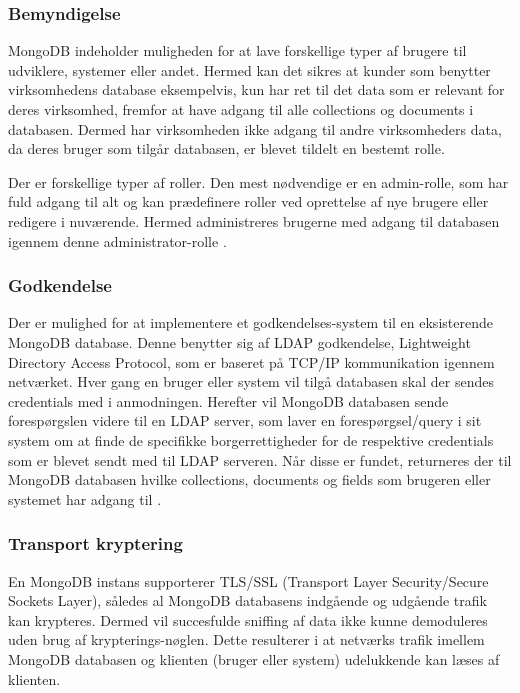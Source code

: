 \begin{appendices}
\subsubsection{Bemyndigelse}
MongoDB indeholder muligheden for at lave forskellige typer af brugere til udviklere, systemer eller andet. Hermed kan det sikres at kunder som benytter virksomhedens database eksempelvis, kun har ret til det data som er relevant for deres virksomhed, fremfor at have adgang til alle collections og documents i databasen. Dermed har virksomheden ikke adgang til andre virksomheders data, da deres bruger som tilgår databasen, er blevet tildelt en bestemt rolle.

Der er forskellige typer af roller. Den mest nødvendige er en admin-rolle, som har fuld adgang til alt og kan prædefinere roller ved oprettelse af nye brugere eller redigere i nuværende. Hermed administreres brugerne med adgang til databasen igennem denne administrator-rolle \cite{mongodb_roles}. \\

\subsubsection{Godkendelse}
Der er mulighed for at implementere et godkendelses-system til en eksisterende MongoDB database. 
Denne benytter sig af LDAP godkendelse, Lightweight Directory Access Protocol, som er baseret på TCP/IP kommunikation igennem netværket. Hver gang en bruger eller system vil tilgå databasen skal der sendes credentials med i anmodningen. Herefter vil MongoDB databasen sende forespørgslen videre til en LDAP server, som laver en forespørgsel/query i sit system om at finde de specifikke borgerrettigheder for de respektive credentials som er blevet sendt med til LDAP serveren. Når disse er fundet, returneres der til MongoDB databasen hvilke collections, documents og fields som brugeren eller systemet har adgang til \cite{mongodb_LDAP}. \\

\subsubsection{Transport kryptering}
En MongoDB instans supporterer TLS/SSL (Transport Layer Security/Secure Sockets Layer), således al MongoDB databasens indgående og udgående trafik kan krypteres. Dermed vil succesfulde sniffing af data ikke kunne demoduleres uden brug af krypterings-nøglen. Dette resulterer i at netværks trafik imellem MongoDB databasen og klienten (bruger eller system) udelukkende kan læses af klienten.


\end{appendices}
